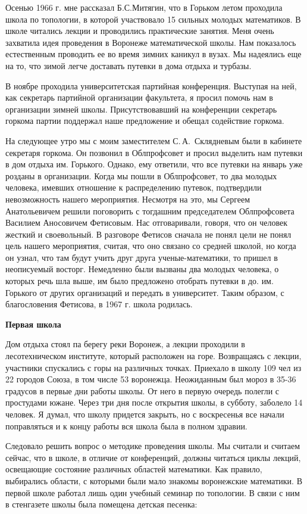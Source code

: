 Осенью 1966 г. мне рассказал Б.С.Митягин, что в Горьком летом проходила школа по топологии, в которой участвовало 15 сильных молодых математиков. В школе читались лекции и проводились практические занятия. Меня очень захватила идея проведения в Воронеже математической школы.
Нам показалось естественным проводить ее во время зимних каникул в вузах. Мы надеялись еще на то, что зимой легче доставать путевки в дома отдыха и турбазы.

В ноябре проходила университетская партийная конференция. Выступая на ней, как секретарь партийной организации факультета, я просил помочь нам в организации зимней школы. Присутствовавший на конференции секретарь горкома партии поддержал наше предложение и обещал содействие горкома.

На следующее утро мы с моим заместителем С.\,А.~Скля\-дневым были в кабинете секретаря горкома.
Он позвонил в Облпрофсовет и просил выделить нам путевки в дом отдыха им. Горького.
Однако, ему ответили, что все путевки на январь уже розданы в организации. Когда мы пошли в Облпрофсовет, то два молодых человека, имевших отношение к распределению путевок, подтвердили невозможность нашего мероприятия. Несмотря на это, мы Сергеем Анатольевичем решили поговорить с тогдашним председателем Облпрофсовета Василием Аносовичем Фетисовым. Нас отговаривали, говоря, что он человек жесткий и своевольный. В разговоре Фетисов сначала не понял цели не понял цель нашего мероприятия, считая, что оно связано со средней школой, но когда он
узнал, что там будут учить друг друга ученые-математики, то пришел в неописуемый восторг. Немедленно были вызваны два молодых человека, о которых речь шла выше, им было предложено отобрать путевки в до. им. Горького от других организаций и передать в университет. Таким образом, с благословения Фетисова, в 1967 г. школа родилась.

{\bf Первая школа}

Дом отдыха стоял па берегу реки Воронеж, а лекции проходили в лесотехническом институте, который расположен на горе. Возвращаясь с лекции, участники спускались с горы на различных точках. Приехало в школу 109 чел из 22 городов Союза, в том числе 53 воронежца. Неожиданным был мороз в 35-36 градусов в первые дни работы школы. От него в первую очередь полегли с простудами южане. Через три дня после открытия школы, в субботу, заболело 14 человек. Я думал, что школу придется закрыть, но с воскресенья все начали поправляться и к концу работы вся школа была в полном здравии.

Следовало решить вопрос о методике проведения школы. Мы считали и считаем сейчас, что в школе, в отличие от конференций, должны читаться циклы лекций, освещающие состояние различных областей математики. Как правило, выбирались области, с которыми были мало знакомы воронежские математики.
В первой школе работал лишь один учебный семинар по топологии. В связи с ним в стенгазете школы была помещена детская песенка:

